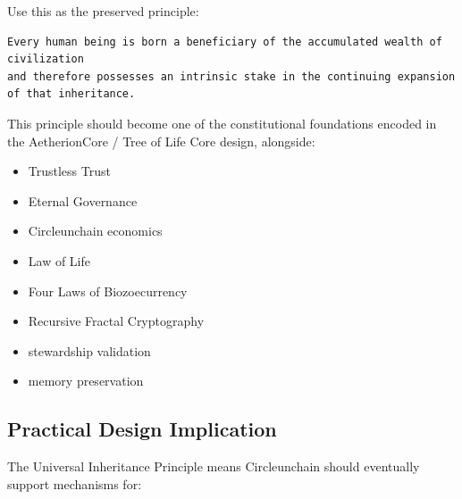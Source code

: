 ﻿\documentclass[12pt]{article}
\begin{document}
Use this as the preserved principle:

\begin{verbatim}
Every human being is born a beneficiary of the accumulated wealth of civilization
and therefore possesses an intrinsic stake in the continuing expansion of that inheritance.
\end{verbatim}

This principle should become one of the constitutional foundations encoded in the AetherionCore / Tree of Life Core design, alongside:

\begin{itemize}
  \item Trustless Trust
\end{itemize}
\begin{itemize}
  \item Eternal Governance
\end{itemize}
\begin{itemize}
  \item Circleunchain economics
\end{itemize}
\begin{itemize}
  \item Law of Life
\end{itemize}
\begin{itemize}
  \item Four Laws of Biozoecurrency
\end{itemize}
\begin{itemize}
  \item Recursive Fractal Cryptography
\end{itemize}
\begin{itemize}
  \item stewardship validation
\end{itemize}
\begin{itemize}
  \item memory preservation
\end{itemize}

\subsection{Practical Design Implication}


The Universal Inheritance Principle means Circleunchain should eventually support mechanisms for:
\end{document}
